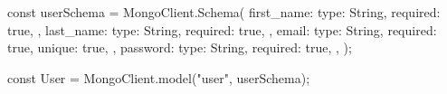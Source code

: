 const userSchema = MongoClient.Schema({
  first_name: {
    type: String,
    required: true,
  },
  last_name: {
    type: String,
    required: true,
  },
  email: {
    type: String,
    required: true,
    unique: true,
  },
  password: {
    type: String,
    required: true,
  },
});


const User = MongoClient.model("user", userSchema);
